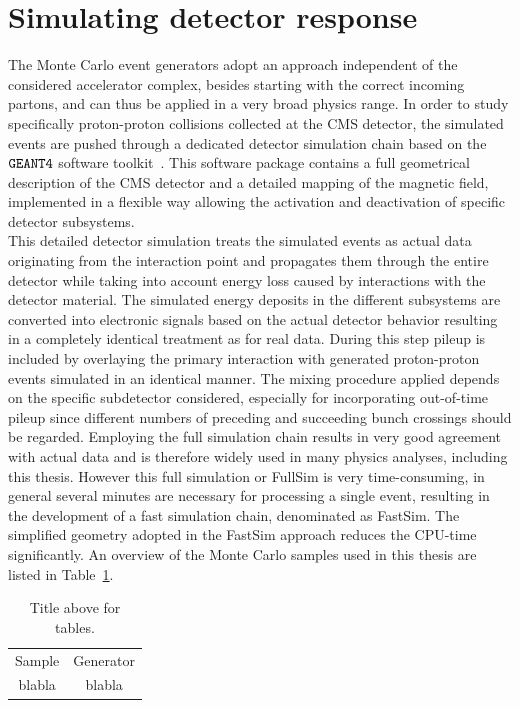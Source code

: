 \section{Simulating detector response} \label{sec::DetectorSim} %
The Monte Carlo event generators adopt an approach independent of the considered accelerator complex, besides starting with the correct incoming partons, and can thus be applied in a very broad physics range. In order to study specifically proton-proton collisions collected at the CMS detector, the simulated events are pushed through a dedicated detector simulation chain based on the $\texttt{GEANT4}$ software toolkit~\cite{}. This software package contains a full geometrical description of the CMS detector and a detailed mapping of the magnetic field, implemented in a flexible way allowing the activation and deactivation of specific detector subsystems.
\\
This detailed detector simulation treats the simulated events as actual data originating from the interaction point and propagates them through the entire detector while taking into account energy loss caused by interactions with the detector material. 
The simulated energy deposits in the different subsystems are converted into electronic signals based on the actual detector behavior resulting in a completely identical treatment as for real data.
During this step pileup is included by overlaying the primary interaction with generated proton-proton events simulated in an identical manner. 
The mixing procedure applied depends on the specific subdetector considered, especially for incorporating out-of-time pileup since different numbers of preceding and succeeding bunch crossings should be regarded.
Employing the full simulation chain results in very good agreement with actual data and is therefore widely used in many physics analyses, including this thesis. However this full simulation or FullSim is very time-consuming, in general several minutes are necessary for processing a single event, resulting in the development of a fast simulation chain, denominated as FastSim. 
The simplified geometry adopted in the FastSim approach reduces the CPU-time significantly. %
An overview of the Monte Carlo samples used in this thesis are listed in Table~\ref{table::Samples}.

\begin{table}[h!t]
 \caption{Title above for tables.} \label{table::Samples}
 \centering
 \begin{tabular}{|c|c|}
  \hline
  Sample & Generator \\
  blabla & blabla \\
  \hline
 \end{tabular}
\end{table}

